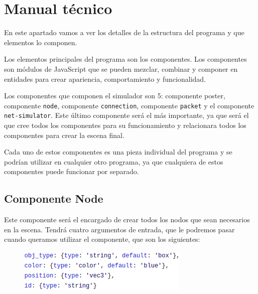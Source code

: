 \documentclass[a4paper, 12pt]{book}
\begin{document}
\section{Manual técnico}

En este apartado vamos a ver los detalles de la estructura
del programa y que elementos lo componen.

Los elementos principales del programa son los componentes. Los componentes son módulos de JavaScript que se pueden mezclar, combinar y componer en entidades para crear apariencia, comportamiento y funcionalidad.

Los componentes que componen el simulador son 5: componente poster, componente \texttt{node}, componente \texttt{connection}, componente \texttt{packet} y el componente \texttt{net-simulator}. Este último componente será el más importante, ya que será el que cree todos los componentes para su funcionamiento y relacionara todos los componentes para crear la escena final.

Cada uno de estos componentes es una pieza individual del programa y se podrían utilizar en cualquier otro programa, ya que cualquiera de estos componentes puede funcionar por separado.

\subsection{Componente Node}

Este componente será el encargado de crear todos los nodos que sean necesarios en la escena. Tendrá cuatro argumentos de entrada, que le podremos pasar cuando queramos utilizar el componente, que son los siguientes:
\newpage

\begin{figure}[h]
\centering
    \includegraphics[scale=0.7]{img/arg_comp_node.png}
\end{figure}
\end{document}
